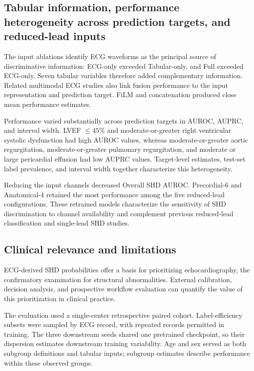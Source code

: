 \subsection{Tabular information, performance heterogeneity across prediction targets, and reduced-lead inputs}
\label{sec:discussion_secondary}

The input ablations identify ECG waveforms as the principal source of discriminative information: ECG-only exceeded Tabular-only, and Full exceeded ECG-only. Seven tabular variables therefore added complementary information. Related multimodal ECG studies also link fusion performance to the input representation and prediction target\cite{jiang_multimodal_lqts_2024,narotamo_multimodal_2024}. FiLM and concatenation produced close mean performance estimates.

Performance varied substantially across prediction targets in AUROC, AUPRC, and interval width. LVEF $\leq45\%$ and moderate-or-greater right ventricular systolic dysfunction had high AUROC values, whereas moderate-or-greater aortic regurgitation, moderate-or-greater pulmonary regurgitation, and moderate or large pericardial effusion had low AUPRC values. Target-level estimates, test-set label prevalence, and interval width together characterize this heterogeneity.

Reducing the input channels decreased Overall SHD AUROC. Precordial-6 and Anatomical-4 retained the most performance among the five reduced-lead configurations. These retrained models characterize the sensitivity of SHD discrimination to channel availability and complement previous reduced-lead classification and single-lead SHD studies\cite{le_lightx3ecg_2023,aminorroaya_adapt_shd_2025}.

\subsection{Clinical relevance and limitations}
\label{sec:discussion_clinical_limitations}

ECG-derived SHD probabilities offer a basis for prioritizing echocardiography, the confirmatory examination for structural abnormalities. External calibration, decision analysis, and prospective workflow evaluation can quantify the value of this prioritization in clinical practice.

The evaluation used a single-center retrospective paired cohort. Label-efficiency subsets were sampled by ECG record, with repeated records permitted in training. The three downstream seeds shared one pretrained checkpoint, so their dispersion estimates downstream training variability. Age and sex served as both subgroup definitions and tabular inputs; subgroup estimates describe performance within these observed groups.

